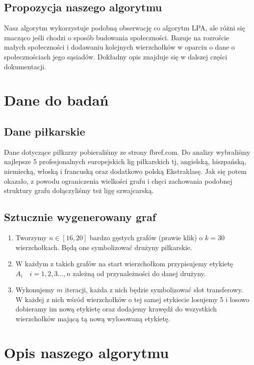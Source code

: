 \documentclass{article}
\begin{document}
\subsection{Propozycja naszego algorytmu}
Nasz algorytm wykorzystuje podobną obserwację co algorytm LPA, ale różni się znacząco jeśli chodzi o sposób budowania społeczności. Bazuje na rozroście małych społeczności i dodawaniu kolejnych wierzchołków w oparciu o dane o społecznościach jego sąsiadów. Dokładny opis znajduje się w dalszej części dokumentacji.
\section{Dane do badań}

\subsection{Dane piłkarskie}
Dane dotyczące piłkarzy pobieraliśmy ze strony fbref.com. Do analizy wybraliśmy najlepsze 5 profesjonalnych europejskich lig piłkarskich tj, angielską, hiszpańską, niemiecką, włoską i francuską oraz dodatkowo polską Ekstraklasę. Jak się potem okazało, z powodu ograniczenia wielkości grafu i chęci zachowania podobnej struktury grafu dołączyliśmy też ligę szwajcarską.

\subsection{Sztucznie wygenerowany graf}

\begin{enumerate}
    \item Tworzymy $ n \in [16,20]$ bardzo gęstych grafów (prawie klik) o $k = 30$ wierzchołkach. Będą one symbolizować drużyny piłkarskie.
    \item W każdym z takich grafów na start wierzchołkom przypisujemy etykietę $A_i \quad i = 1,2,3...,n $  zależną od przynależności do danej drużyny.
    \item Wykonujemy $m$ iteracji, każda z nich będzie symbolizować slot transferowy. W każdej z nich wśród wierzchołków o tej samej etykiecie losujemy 5 i losowo dobieramy im nową etykietę oraz dodajemy krawędź do wszystkich wierzchołków mającą tą nową wylosowaną etykietę.
\end{enumerate}

\section{Opis naszego algorytmu}
\end{document}
